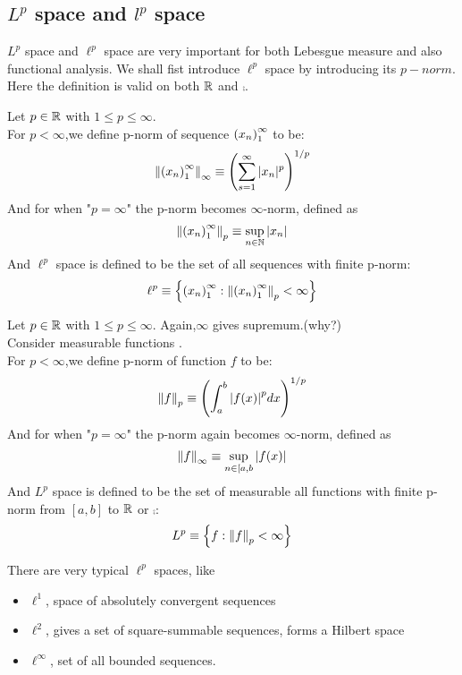 \subsection{\texorpdfstring{$L^p$}. space and \texorpdfstring{${l}^p$}. space}
$L^p$ space and $\ell^p$ space are very important for both Lebesgue measure and also functional analysis. We shall fist introduce $\ell^p$ space by introducing its $p-norm$. Here the definition is valid on both $\mathbb{R}$ and $\comp$.

\begin{definition}\rm\nextline
	Let $p\in\mathbb{R}$ with $1\leq p\leq\infty$. \\
	For $p<\infty$,we define p-norm of sequence $\left({x_n}\right)_1^\infty$ to be:
	$$
		\left\|{\left({x_n}\right)_1^\infty}\right\|_\infty\equiv\left(\sum_{s=1}^\infty|x_n|^p\right)^{1/p}
	$$
	And for when "$p=\infty$" the p-norm becomes $\infty$-norm, defined as
	$$
		\left\|{\left({x_n}\right)_1^\infty}\right\|_p\equiv\sup_{n\in\mathbb{N}}|x_n|
	$$
	And $\ell^p$ space is defined to be the set of all sequences with finite p-norm:
	$$
		\ell^p\equiv\left\{\left({x_n}\right)_1^\infty:\left\|{\left({x_n}\right)_1^\infty}\right\|_p<\infty\right\}
	$$
\end{definition}

\begin{definition}\rm\nextline
	Let $p\in\mathbb{R}$ with $1\leq p\leq\infty$. Again,$\infty$ gives supremum.(why?)\\
	Consider measurable functions .\\
	For $p<\infty$,we define p-norm of function $f$ to be:
	$$
		\left\|{f}\right\|_p\equiv\left(\int_a^b{|f(x)|}^p dx \right)^{1/p}
	$$
	And for when "$p=\infty$" the p-norm again becomes $\infty$-norm, defined as
	$$
		\left\|{f}\right\|_\infty\equiv\sup_{n\in[a,b}|f(x)|
	$$
	And $L^p$ space is defined to be the set of measurable all functions with finite p-norm from $[a,b]$ to $\mathbb{R}$ or $\comp$:
	$$
		L^p\equiv\left\{f:\left\|{f}\right\|_p<\infty\right\}
	$$
\end{definition}

\begin{remark}\rm\nextline
	There are very typical $\ell^p$ spaces, like
	\begin{itemize}
		\item $\ell^1$, space of absolutely convergent sequences
		\item $\ell^2$, gives a set of square-summable sequences, forms a Hilbert space
		\item $\ell^\infty$, set of all bounded sequences.
	\end{itemize}

\end{remark}